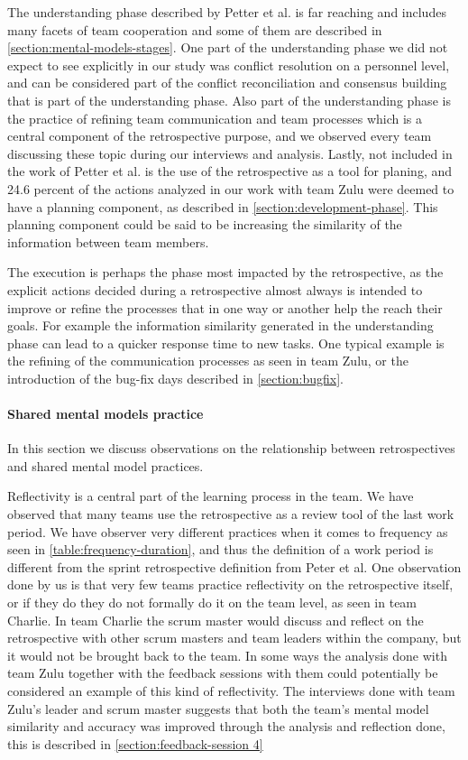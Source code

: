 The understanding phase described by Petter et al. \cite{Petter2013} is far reaching and includes many facets of team cooperation and some of them are described in \autoref{section:mental-models-stages}. One part of the understanding phase we did not expect to see explicitly in our study was conflict resolution on a personnel level, and can be considered part of the conflict reconciliation and consensus building that is part of the understanding phase. Also part of the understanding phase is the practice of refining team communication and team processes which is a central component of the retrospective purpose, and we observed every team discussing these topic during our interviews and analysis. Lastly, not included in the work of Petter et al. is the use of the retrospective as a tool for planing, and 24.6 percent of the actions analyzed in our work with team Zulu were deemed to have a planning component, as described in \autoref{section:development-phase}. This planning component could be said to be increasing the similarity of the information between team members.

The execution is perhaps the phase most impacted by the retrospective, as the explicit actions decided during a retrospective almost always is intended to improve or refine the processes that in one way or another help the reach their goals. For example the information similarity generated in the understanding phase can lead to a quicker response time to new tasks. One typical example is the refining of the communication processes as seen in team Zulu, or the introduction of the bug-fix days described in \autoref{section:bugfix}. 

\paragraph{Shared mental models practice}
In this section we discuss observations on the relationship between retrospectives and shared mental model practices.

Reflectivity is a central part of the learning process in the team. We have observed that many teams use the retrospective as a review tool of the last work period. We have observer very different practices when it comes to frequency as seen in \autoref{table:frequency-duration}, and thus the definition of a work period is different from the sprint retrospective definition from Peter et al. One observation done by us is that very few teams practice reflectivity on the retrospective itself, or if they do they do not formally do it on the team level, as seen in team Charlie. In team Charlie the scrum master would discuss and reflect on the retrospective with other scrum masters and team leaders within the company, but it would not be brought back to the team. In some ways the analysis done with team Zulu together with the feedback sessions with them could potentially be considered an example of this kind of reflectivity. The interviews done with team Zulu's leader and scrum master suggests that both the team's mental model similarity and accuracy was improved through the analysis and reflection done, this is described in \autoref{section:feedback-session 4}

